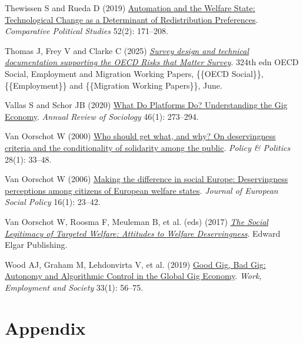 \documentclass[
  12pt,
]{article}
\newlength{\cslhangindent}
\newenvironment{CSLReferences}[2] %
 {\begin{list}{}{%
  \setlength{\itemindent}{0pt}
  \setlength{\leftmargin}{0pt}
  \setlength{\parsep}{0pt}
  \ifodd #1
   \setlength{\leftmargin}{\cslhangindent}
   \setlength{\itemindent}{-1\cslhangindent}
  \fi
  \setlength{\itemsep}{#2\baselineskip}}}
 {\end{list}}
\begin{document}
\begin{CSLReferences}{1}{1}
Thewissen S and Rueda D (2019)
\href{https://doi.org/10.1177/0010414017740600}{Automation and the
{Welfare State}: {Technological Change} as a {Determinant} of
{Redistribution Preferences}}. \emph{Comparative Political Studies}
52(2): 171--208.

Thomas J, Frey V and Clarke C (2025)
\emph{\href{https://doi.org/10.1787/5eebe551-en}{Survey design and
technical documentation supporting the {OECD Risks} that {Matter
Survey}}}. 324th edn {OECD Social}, {Employment} and {Migration Working
Papers}, \{\{OECD Social\}\}, \{\{Employment\}\} and \{\{Migration
Working Papers\}\}, June.

Vallas S and Schor JB (2020)
\href{https://doi.org/10.1146/annurev-soc-121919-054857}{What {Do
Platforms Do}? {Understanding} the {Gig Economy}}. \emph{Annual Review
of Sociology} 46(1): 273--294.

Van Oorschot W (2000)
\href{https://doi.org/10.1332/0305573002500811}{Who should get what, and
why? {On} deservingness criteria and the conditionality of solidarity
among the public}. \emph{Policy \& Politics} 28(1): 33--48.

Van Oorschot W (2006)
\href{https://doi.org/10.1177/0958928706059829}{Making the difference in
social {Europe}: Deservingness perceptions among citizens of {European}
welfare states}. \emph{Journal of European Social Policy} 16(1): 23--42.

Van Oorschot W, Roosma F, Meuleman B, et al. (eds) (2017)
\emph{\href{https://doi.org/10.4337/9781785367212}{The {Social
Legitimacy} of {Targeted Welfare}: {Attitudes} to {Welfare
Deservingness}}}. Edward Elgar Publishing.

Wood AJ, Graham M, Lehdonvirta V, et al. (2019)
\href{https://doi.org/10.1177/0950017018785616}{Good {Gig}, {Bad Gig}:
{Autonomy} and {Algorithmic Control} in the {Global Gig Economy}}.
\emph{Work, Employment and Society} 33(1): 56--75.

\end{CSLReferences}

\section{Appendix}\label{appendix}
\end{document}
